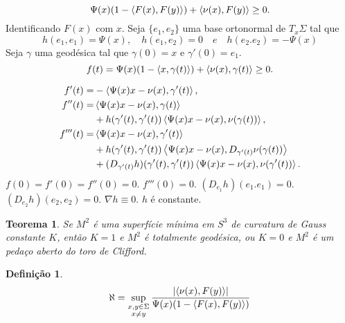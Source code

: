 \documentclass[12pt,a4paper]{beamer}
\newtheorem{teorema}{Teorema}
\theoremstyle{definition}
\newtheorem{definicao}{Definição}
\begin{document}
\begin{frame}
	\begin{equation*}
		\Psi(x) (1-\left\langle F(x),F(y) \right\rangle) + \left\langle \nu(x),F(y) \right\rangle \geq 0.
	\end{equation*}
	Identificando $F(x)$ com $x$.
	Seja $\{ e_1,e_2 \}$ uma base ortonormal de $T_x \Sigma$ tal que
	\begin{equation*}
		h(e_1,e_1)=\Psi(x), \quad h(e_1,e_2)=0 \quad e \quad h(e_2.e_2)=-\Psi(x)
	\end{equation*}
	Seja $\gamma$ uma geodésica tal que $\gamma(0)=x$ e $\gamma'(0)=e_1$.
	\begin{equation*}
		f(t) = \Psi(x) (1-\left\langle x,\gamma(t) \right\rangle) + \left\langle \nu(x),\gamma(t) \right\rangle \geq 0.
	\end{equation*}
	
\end{frame}

\begin{frame}
	\begin{align*}
	f'(t) =& -\left\langle \Psi(x)x - \nu(x),\gamma'(t) \right\rangle,\\
	f''(t) =& \left\langle \Psi(x)x - \nu(x),\gamma(t) \right\rangle\\
	& + h(\gamma'(t),\gamma'(t)) \left\langle \Psi(x)x - \nu(x),\nu(\gamma(t)) \right\rangle,\\
	f'''(t) =& \left\langle \Psi(x)x - \nu(x),\gamma'(t) \right\rangle\\
	& + h(\gamma'(t),\gamma'(t)) \left\langle \Psi(x)x - \nu(x),D_{\gamma'(t)} \nu(\gamma(t)) \right\rangle\\
	& + (D_{\gamma'(t)} h) (\gamma'(t),\gamma'(t)) \left\langle \Psi(x)x - \nu(x),\nu(\gamma'(t)) \right\rangle.
	\end{align*}
	$f(0)=f'(0)=f''(0)=0$.
	$f'''(0)=0$.
	$(D_{e_1}h)(e_1.e_1)=0$.
	$(D_{e_2}h)(e_2,e_2)=0$.
	$\nabla h \equiv 0$.
	$h$ é constante.
\end{frame}

\begin{frame}
	\begin{teorema}
		Se $M^2$ é uma superfície mínima em $S^3$ de curvatura de Gauss constante $K$, então $K=1$ e $M^2$ é totalmente geodésica, ou $K=0$ e $M^2$ é um pedaço aberto do toro de Clifford.
	\end{teorema}
\end{frame}

\begin{frame}
	\begin{definicao}
		\begin{equation*}
			\aleph = \sup_{\substack{x,y \in \Sigma \\ x \neq y}} \frac{\left| \left\langle \nu(x),F(y) \right\rangle \right|}{\Psi(x) (1-\left\langle F(x),F(y) \right\rangle)}
		\end{equation*}
	\end{definicao}
\end{frame}
\end{document}
